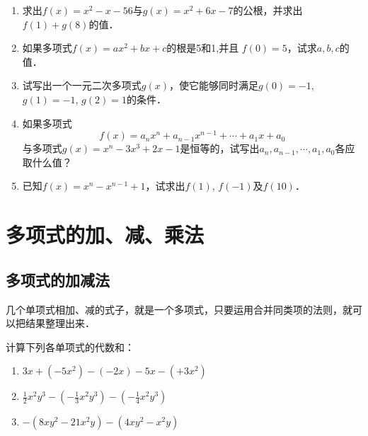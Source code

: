 \begin{enumerate}
\item 求出$f(x)=x^2-x-56$与$g(x)=x^2+6x-7$的公根，并求出$f(1)+g(8)$的值．
\item 如果多项式$f(x)=ax^2+bx+c$的根是5和1,并且
$f(0)=5$，试求$a,b,c$的值．
\item 试写出一个一元二次多项式$g(x)$，使它能够同时满足$g(0)=-1$, $g(1)=-1$, $g(2)=1$的条件．
\item 如果多项式
\[f (x) =a_nx^n+a_{n-1} x^{n-1}+\cdots+a_1x+a_0\]
与多项式$g(x)=x^n-3x^3+2x-1$是恒等的，试写出$a_n,a_{n-1},\cdots,a_1,a_0$各应取什么值？
\item 已知$f(x)=x^n-x^{n-1}+1$，试求出$f(1)$, $f(-1)$及$f (10)$．

\end{enumerate}


\section{多项式的加、减、乘法}
\subsection{多项式的加减法}
几个单项式相加、减的式子，就是一个多项式，只要运用合并同类项的法则，就可以把结果整理出来．

\begin{example}
    计算下列各单项式的代数和：
\begin{enumerate}
    \item $3x+(-5x^2)-(-2x)-5x-(+3x^2)$
    \item $\frac{1}{2}x^2y^3-\left(-\frac{1}{3}x^2y^3\right)-\left(-\frac{1}{4}x^2y^3\right)$
    \item $-(8xy^2-21x^2y)-(4xy^2-x^2y)$
\end{enumerate}
\end{example}

